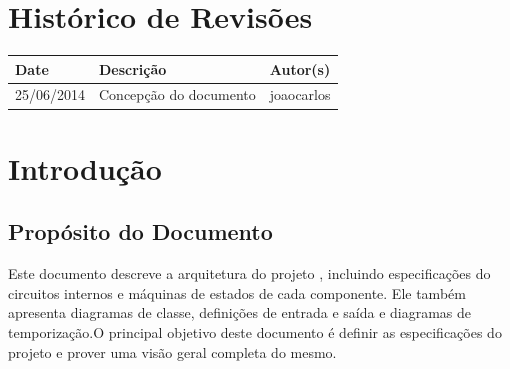 \documentclass{report}
\begin{document}
\capa
%

\chapter*{Histórico de Revisões}
  \vspace*{1cm}
  \begin{table}[ht]
    \centering
    \begin{tabular}[pos]{|m{2cm} | m{8cm} | m{4cm}|} 
      \hline
      \cellcolor[gray]{0.9}
      \textbf{Date} & \cellcolor[gray]{0.9}\textbf{Descrição} & \cellcolor[gray]{0.9}\textbf{Autor(s)}\\
      \hline
      25/06/2014 &  Concepção do documento & joaocarlos \\ \hline
    \end{tabular}
  \end{table}

\tableofcontents

\chapter{Introdução}
  
  \section{Propósito do Documento}
  Este documento descreve a arquitetura do projeto \ipPROCESSProject, incluindo especificações do circuitos internos e máquinas de estados de cada componente. Ele também apresenta diagramas de classe, definições de entrada e saída e diagramas de temporização.O principal objetivo deste documento é definir as especificações do projeto \ipPROCESSProject e prover uma visão geral completa do mesmo.
\end{document}

